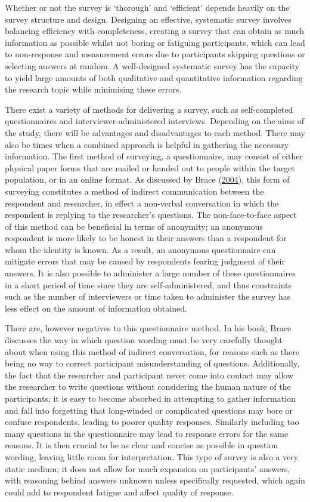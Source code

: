 \documentclass[
  11pt,
]{book}
\begin{document}
Whether or not the survey is `thorough' and `efficient' depends heavily
on the survey structure and design. Designing an effective, systematic
survey involves balancing efficiency with completeness, creating a
survey that can obtain as much information as possible whilst not boring
or fatiguing participants, which can lead to non-response and
measurement errors due to participants skipping questions or selecting
answers at random. A well-designed systematic survey has the capacity to
yield large amounts of both qualitative and quantitative information
regarding the research topic while minimising these errors.

There exist a variety of methods for delivering a survey, such as
self-completed questionnaires and interviewer-administered interviews.
Depending on the aims of the study, there will be advantages and
disadvantages to each method. There may also be times when a combined
approach is helpful in gathering the necessary information. The first
method of surveying, a questionnaire, may consist of either physical
paper forms that are mailed or handed out to people within the target
population, or in an online format. As discussed by Brace
(\protect\hyperlink{ref-brace2004}{2004}), this form of surveying
constitutes a method of indirect communication between the respondent
and researcher, in effect a non-verbal conversation in which the
respondent is replying to the researcher's questions. The
non-face-to-face aspect of this method can be beneficial in terms of
anonymity; an anonymous respondent is more likely to be honest in their
answers than a respondent for whom the identity is known. As a result,
an anonymous questionnaire can mitigate errors that may be caused by
respondents fearing judgment of their answers. It is also possible to
administer a large number of these questionnaires in a short period of
time since they are self-administered, and thus constraints such as the
number of interviewers or time taken to administer the survey has less
effect on the amount of information obtained.

There are, however negatives to this questionnaire method. In his book,
Brace discusses the way in which question wording must be very carefully
thought about when using this method of indirect conversation, for
reasons such as there being no way to correct participant
misunderstanding of questions. Additionally, the fact that the
researcher and participant never come into contact may allow the
researcher to write questions without considering the human nature of
the participants; it is easy to become absorbed in attempting to gather
information and fall into forgetting that long-winded or complicated
questions may bore or confuse respondents, leading to poorer quality
responses. Similarly including too many questions in the questionnaire
may lead to response errors for the same reasons. It is then crucial to
be as clear and concise as possible in question wording, leaving little
room for interpretation. This type of survey is also a very static
medium; it does not allow for much expansion on participants' answers,
with reasoning behind answers unknown unless specifically requested,
which again could add to respondent fatigue and affect quality of
response.
\end{document}
